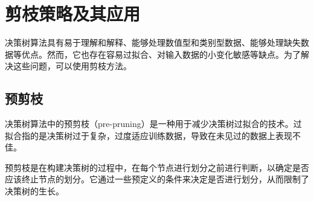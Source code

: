 \documentclass[a4paper,12pt,onecolumn,oneside]{article}
\begin{document}
\section{剪枝策略及其应用}
	决策树算法具有易于理解和解释、能够处理数值型和类别型数据、能够处理缺失数据等优点。然而，它也存在容易过拟合、对输入数据的小变化敏感等缺点。为了解决这些问题，可以使用剪枝方法。
\subsection{预剪枝}
	决策树算法中的预剪枝（pre-pruning）是一种用于减少决策树过拟合的技术。过拟合指的是决策树过于复杂，过度适应训练数据，导致在未见过的数据上表现不佳。
	
	预剪枝是在构建决策树的过程中，在每个节点进行划分之前进行判断，以确定是否应该终止节点的划分。它通过一些预定义的条件来决定是否进行划分，从而限制了决策树的生长。
	
\end{document}
